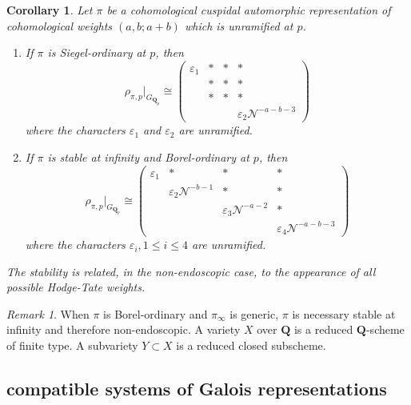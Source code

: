 \documentclass[leqno]{amsart}
\newcommand{\smat}[1]{\left( \begin{smallmatrix} #1 \end{smallmatrix} \right)}
\newcommand{\Q}{{\mathbf{Q}}}
\newcommand{\Qp}{\mathbf{Q}_p}
\newcommand{\1}{\mathbf{1}}
\newtheorem{cor}[thm]{Corollary}
\theoremstyle{definition}
\theoremstyle{remark}
\newtheorem{rem}[thm]{Remark}
\begin{document}
\begin{cor}
	Let $\pi$ be a cohomological cuspidal automorphic
	representation of 
	cohomological weights  $(a,b;a+b)$
	which is unramified at $p$.
	\begin{enumerate}[label=(\alph*)]
		\item If $\pi$ is Siegel-ordinary at  $p$, then 
			\[
				\rho_{\pi,p}\vert_{G_{\Qp}}\cong
				\smat{\varepsilon_1&*&*&*\\
				&*&*&*\\
				&*&*&*\\
				&&&\varepsilon_2
				\mathcal{N}^{-a-b-3}}
			\]
			where the characters
			 $\varepsilon_1$ and 
			 $\varepsilon_2$ are unramified.
		 \item If  $\pi$ is stable at infinity
			 and  Borel-ordinary at $p$, then
			\[
				\rho_{\pi,p}\vert_{G_{\Qp}}\cong
			\smat{\varepsilon_1&*&*&*\\
			&\varepsilon_2\mathcal{N}^{-b-1}&*&*\\
			&&\varepsilon_3\mathcal{N}^{-a-2}&*\\
			&&&\varepsilon_4\mathcal{N}^{-a-b-3}}
			\]
			where the characters
			 $\varepsilon_i,1\leq i\leq 4$ 
			 are unramified.
	\end{enumerate}
	The stability is related, in the non-endoscopic case,
	to the appearance of all possible Hodge-Tate weights.
\end{cor}
\begin{rem}
	When $\pi$ is Borel-ordinary
	and  $\pi_\infty$ is generic,
	 $\pi$ is necessary stable at infinity
	 and therefore non-endoscopic.
	 A variety $X$ over  $\Q$
	 is a reduced  $\Q$-scheme of finite type.
	 A subvariety $Y\subset X$
	 is a reduced closed subscheme.
\end{rem}

\subsection{compatible systems of Galois representations}
\end{document}
